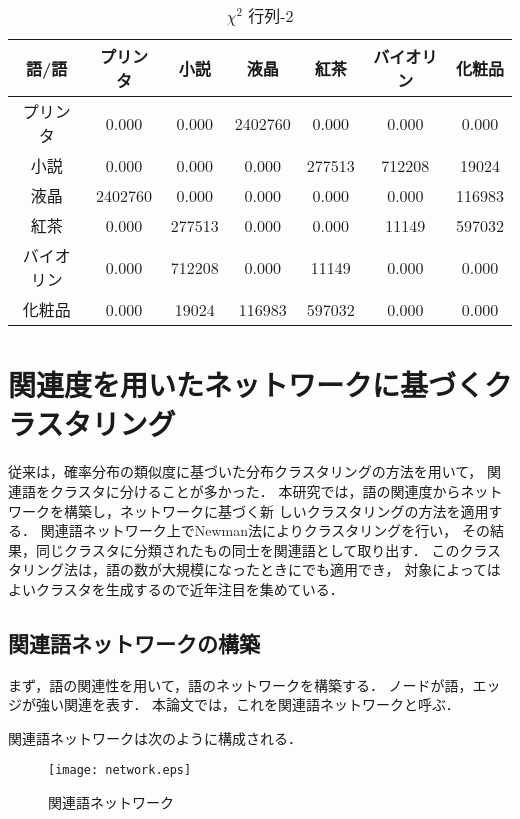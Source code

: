 \documentclass[japanese]{jnlp_1.3a}
\begin{document}
\begin{table}[tb]
	\begin{center}
		\caption{$\chi^2$ 行列-2}
	\label{chilist2}
	\begin{tabular}{c|cccccc}
	 語/語 & プリンタ & 小説 & 液晶 & 紅茶 & バイオリン & 化粧品 \\ \hline
	 プリンタ & 0.000 & 0.000 & 2402760 & 0.000 & 0.000 & 0.000 \\ 
	 小説 & 0.000 & 0.000 & 0.000 & 277513 & 712208 & 19024 \\ 
	 液晶 & 2402760 & 0.000 & 0.000 & 0.000 & 0.000 & 116983 \\ 
	 紅茶 & 0.000 & 277513 & 0.000 & 0.000 & 11149 & 597032 \\ 
	 バイオリン & 0.000 & 712208 & 0.000 & 11149 & 0.000 & 0.000  \\ 
	 化粧品 & 0.000 & 19024 & 116983 & 597032 & 0.000 & 0.000 \\ \hline
	\end{tabular}
	\end{center}
\end{table}


\section{関連度を用いたネットワークに基づくクラスタリング}


従来は，確率分布の類似度に基づいた分布クラスタリングの方法を用いて，
関連語をクラスタに分けることが多かった．
本研究では，語の関連度からネットワークを構築し，ネットワークに基づく新
しいクラスタリングの方法を適用する．
関連語ネットワーク上でNewman法によりクラスタリングを行い，
その結果，同じクラスタに分類されたもの同士を関連語として取り出す．
このクラスタリング法は，語の数が大規模になったときにでも適用でき，
対象によってはよいクラスタを生成するので近年注目を集めている．

\subsection{関連語ネットワークの構築}

まず，語の関連性を用いて，語のネットワークを構築する．
ノードが語，エッジが強い関連を表す．
本論文では，これを関連語ネットワークと呼ぶ．

関連語ネットワークは次のように構成される．

\begin{figure}[b]
\begin{center}
  \texttt{[image: network.eps]}
 \caption{関連語ネットワーク}
 \label{related-network}
\end{center}
\end{figure}
\end{document}
